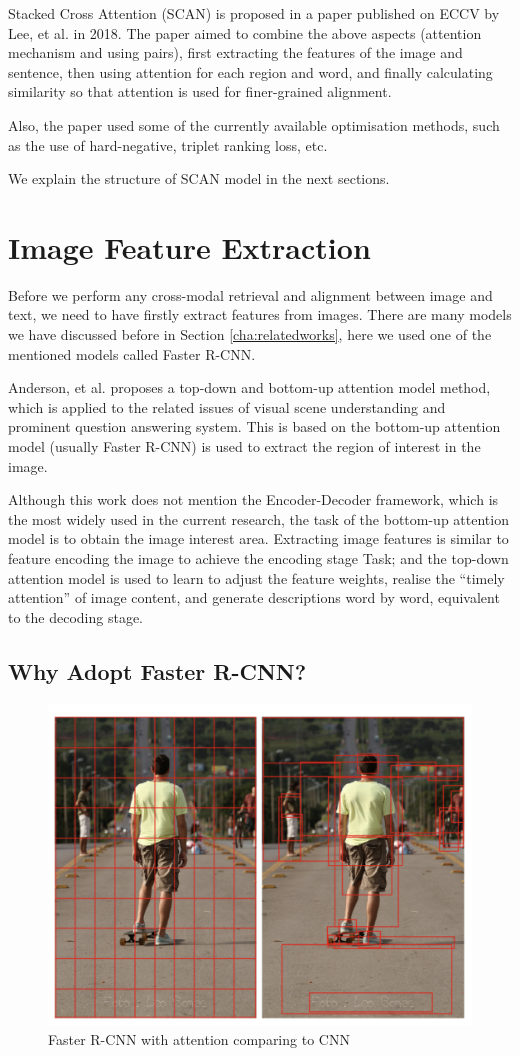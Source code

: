 Stacked Cross Attention (SCAN) is proposed in a paper published on ECCV by Lee, et al. \cite{scan} in 2018. The paper aimed to combine the above aspects (attention mechanism and using pairs), first extracting the features of the image and sentence, then using attention for each region and word, and finally calculating similarity so that attention is used for finer-grained alignment.

Also, the paper used some of the currently available optimisation methods, such as the use of hard-negative, triplet ranking loss, etc.

We explain the structure of SCAN model in the next sections.

\section{Image Feature Extraction}
Before we perform any cross-modal retrieval and alignment between image and text, we need to have firstly extract features from images. There are many models we have discussed before in Section \ref{cha:relatedworks}, here we used one of the mentioned models called Faster R-CNN. 

Anderson, et al. \cite{bottomup} proposes a top-down and bottom-up attention model method, which is applied to the related issues of visual scene understanding and prominent question answering system. This is based on the bottom-up attention model (usually Faster R-CNN) is used to extract the region of interest in the image. 

Although this work \cite{bottomup} does not mention the Encoder-Decoder framework, which is the most widely used in the current research, the task of the bottom-up attention model is to obtain the image interest area. Extracting image features is similar to feature encoding the image to achieve the encoding stage Task; and the top-down attention model is used to learn to adjust the feature weights, realise the ``timely attention'' of image content, and generate descriptions word by word, equivalent to the decoding stage.


\subsection{Why Adopt Faster R-CNN?}

\begin{figure}[h!]
\centering
\includegraphics[width=.4\textwidth]{whyfasterrcnn.pdf}
\caption{Faster R-CNN with attention comparing to CNN \cite{bottomup}}
\label{fig:fasterrcnnbottomup}
\end{figure}

